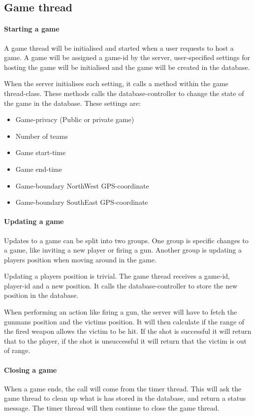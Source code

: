\subsection{Game thread}
\paragraph{Starting a game}
A game thread will be initialised and started when a user requests to host a game. A game will be assigned a game-id by the server, user-specified settings for hosting the game will be initialised and the game will be created in the database. 

When the server initialises each setting, it calls a method within the game thread-class. These methods calls the database-controller to change the state of the game in the database. These settings are:
\begin{itemize}
\item Game-privacy (Public or private game)
\item Number of teams
\item Game start-time
\item Game end-time
\item Game-boundary NorthWest GPS-coordinate
\item Game-boundary SouthEast GPS-coordinate
\end{itemize}

\paragraph{Updating a game}
Updates to a game can be split into two groups. One group is specific changes to a game, like inviting a new player or firing a gun. Another group is updating a players position when moving around in the game.

Updating a players position is trivial. The game thread receives a game-id, player-id and a new position. It calls the database-controller to store the new position in the database.

When performing an action like firing a gun, the server will have to fetch the gunmans position and the victims position. It will then calculate if the range of the fired weapon allows the victim to be hit. If the shot is successful it will return that to the player, if the shot is unsuccessful it will return that the victim is out of range. 


\paragraph{Closing a game}
When a game ends, the call will come from the timer thread. This will ask the game thread to clean up what is has stored in the database, and return a status message. The timer thread will then continue to close the game thread. 